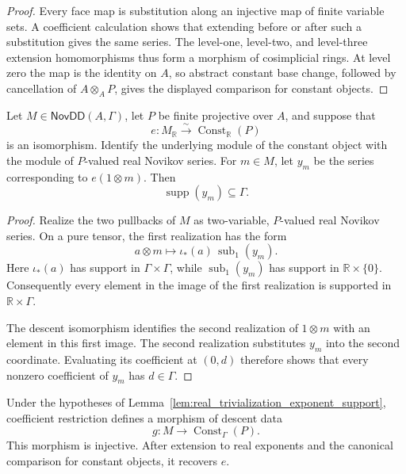 \begin{proof}
  \leanok
  Every face map is substitution along an injective map of finite variable
  sets.  A coefficient calculation shows that extending before or after such
  a substitution gives the same series.  The level-one, level-two, and
  level-three extension homomorphisms thus form a morphism of cosimplicial
  rings.  At level zero the map is the identity on $A$, so abstract constant
  base change, followed by cancellation of $A\otimes_A P$, gives the displayed
  comparison for constant objects.
\end{proof}

\begin{lemma}
  \label{lem:real_trivialization_exponent_support}
  \leanok
  Let $M\in\mathsf{NovDD}(A,\Gamma)$, let $P$ be finite projective over $A$,
  and suppose that
  \[
    e\colon M_{\mathbb{R}}\xrightarrow{\sim}
      \operatorname{Const}_{\mathbb{R}}(P)
  \]
  is an isomorphism.  Identify the underlying module of the constant object
  with the module of $P$-valued real Novikov series.  For $m\in M$, let
  $y_m$ be the series corresponding to $e(1\otimes m)$.  Then
  \[
    \operatorname{supp}(y_m)\subseteq\Gamma.
  \]
\end{lemma}

\begin{proof}
  \leanok
  Realize the two pullbacks of $M$ as two-variable, $P$-valued real Novikov
  series.  On a pure tensor, the first realization has the form
  \[
    a\otimes m\longmapsto
      \iota_*(a)\,\operatorname{sub}_1(y_m).
  \]
  Here $\iota_*(a)$ has support in $\Gamma\times\Gamma$, while
  $\operatorname{sub}_1(y_m)$ has support in $\mathbb{R}\times\{0\}$.
  Consequently every element in the image of the first realization is
  supported in $\mathbb{R}\times\Gamma$.

  The descent isomorphism identifies the second realization of $1\otimes m$
  with an element in this first image.  The second realization substitutes
  $y_m$ into the second coordinate.  Evaluating its coefficient at $(0,d)$
  therefore shows that every nonzero coefficient of $y_m$ has
  $d\in\Gamma$.
\end{proof}

\begin{proposition}
  \label{prop:restricted_real_trivialization}
  \leanok
  Under the hypotheses of
  Lemma~\ref{lem:real_trivialization_exponent_support}, coefficient restriction
  defines a morphism of descent data
  \[
    g\colon M\longrightarrow\operatorname{Const}_\Gamma(P).
  \]
  This morphism is injective.  After extension to real exponents and the
  canonical comparison for constant objects, it recovers $e$.
\end{proposition}

